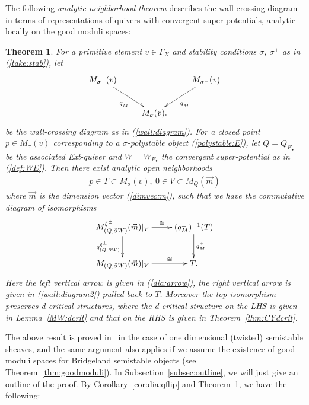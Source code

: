 \documentclass[11pt]{amsart}
\theoremstyle{plain}
\newtheorem{thm}{Theorem}[section]
\theoremstyle{definition}
\theoremstyle{remark}
\begin{document}
The following \textit{analytic neighborhood theorem}
describes the 
wall-crossing diagram 
in terms of representations of quivers with 
convergent super-potentials, analytic locally 
on the good moduli spaces: 
\begin{thm}\label{thm:Equiver}
For a primitive element 
$v \in \Gamma_X$ and 
stability conditions $\sigma$, $\sigma^{\pm}$
as in (\ref{take:stab}), 
let 
\begin{align}\label{wall:diagram2}
\xymatrix{
M_{\sigma^{+}}(v) \ar[rd]_-{q_M^+} & & \ar[ld]^-{q_M^-} M_{\sigma^{-}}(v) \\
&  M_{\sigma}(v).  &
}
\end{align}
be the wall-crossing diagram as in (\ref{wall:diagram}). 
For a closed point 
$p\in M_{\sigma}(v)$ corresponding to a $\sigma$-polystable 
object (\ref{polystable:E}),
let $Q=Q_{E_{\bullet}}$ be the associated 
Ext-quiver
and $W=W_{E_{\bullet}}$ the 
convergent super-potential as in (\ref{def:WE}). 
Then there exist
 analytic 
open neighborhoods 
\begin{align*}
p \in T \subset M_{\sigma}(v), \ 
0 \in V \subset M_{Q}(\vec{m})
\end{align*}
where $\vec{m}$ is the dimension vector (\ref{dimvec:m}), 
such that we have the commutative diagram of isomorphisms 
\begin{align}\label{dia:local}
\xymatrix{
M^{\xi^{\pm}}_{(Q, \partial W)}(\vec{m})|_{V} \ar[r]^-{\cong} 
\ar[d]_-{q_{(Q, \partial W)}^{\xi^{\pm}}} &
(q_M^{\pm})^{-1}(T) \ar[d]^-{q_M^{\pm}} \\
M_{(Q, \partial W)}(\vec{m})|_{V} \ar[r]^-{\cong} & T. 
}
\end{align}
Here the left vertical arrow is given in (\ref{dia:arrow}), 
the right vertical arrow is given 
in (\ref{wall:diagram2}) pulled back to
$T$. Moreover the top isomorphism 
preserves d-critical structures, where 
the d-critical structure on the LHS is given in Lemma~\ref{MW:dcrit}
and that on the RHS is given in Theorem~\ref{thm:CYdcrit}.
\end{thm}
The above result is proved in~\cite[Theorem~7.7]{Todstack}
in the case of one dimensional (twisted) semistable sheaves, 
and the same argument also applies
if we assume the existence of good moduli spaces for
Bridgeland semistable objects 
(see Theorem~\ref{thm:goodmoduli}). 
In Subsection~\ref{subsec:outline}, we will 
 just give an outline of the proof. 
By Corollary~\ref{cor:dia:qflip}
 and Theorem~\ref{thm:Equiver}, we have the following: 
\end{document}
